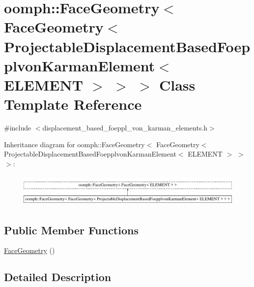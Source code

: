 \hypertarget{classoomph_1_1FaceGeometry_3_01FaceGeometry_3_01ProjectableDisplacementBasedFoepplvonKarmanElement_3_01ELEMENT_01_4_01_4_01_4}{}\section{oomph\+:\+:Face\+Geometry$<$ Face\+Geometry$<$ Projectable\+Displacement\+Based\+Foepplvon\+Karman\+Element$<$ E\+L\+E\+M\+E\+NT $>$ $>$ $>$ Class Template Reference}
\label{classoomph_1_1FaceGeometry_3_01FaceGeometry_3_01ProjectableDisplacementBasedFoepplvonKarmanElement_3_01ELEMENT_01_4_01_4_01_4}


{\ttfamily \#include $<$displacement\+\_\+based\+\_\+foeppl\+\_\+von\+\_\+karman\+\_\+elements.\+h$>$}

Inheritance diagram for oomph\+:\+:Face\+Geometry$<$ Face\+Geometry$<$ Projectable\+Displacement\+Based\+Foepplvon\+Karman\+Element$<$ E\+L\+E\+M\+E\+NT $>$ $>$ $>$\+:\begin{figure}[H]
\begin{center}
\leavevmode
\includegraphics[height=1.647059cm]{classoomph_1_1FaceGeometry_3_01FaceGeometry_3_01ProjectableDisplacementBasedFoepplvonKarmanElement_3_01ELEMENT_01_4_01_4_01_4}
\end{center}
\end{figure}
\subsection*{Public Member Functions}
\begin{DoxyCompactItemize}
\item 
\hyperlink{classoomph_1_1FaceGeometry_3_01FaceGeometry_3_01ProjectableDisplacementBasedFoepplvonKarmanElement_3_01ELEMENT_01_4_01_4_01_4_a909f3e87e9875f241b3b5586231d2a76}{Face\+Geometry} ()
\end{DoxyCompactItemize}


\subsection{Detailed Description}
